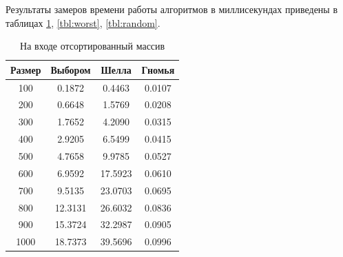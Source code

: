 Результаты замеров времени работы алгоритмов в миллисекундах приведены в таблицах \ref{tbl:best}, \ref{tbl:worst}, \ref{tbl:random}.

\begin{table}[h]
	\begin{center}
		\begin{threeparttable}
		\captionsetup{justification=raggedleft,singlelinecheck=off}
		\caption{На входе отсортированный массив}
		\label{tbl:best}
		\begin{tabular}{|c|c|c|c|}
			\hline
			Размер & Выбором & Шелла & Гномья \\
			\hline
  			100 & 0.1872 & 0.4463 & 0.0107 \\ 
 			\hline
  			200 & 0.6648 & 1.5769 & 0.0208 \\ 
 			\hline
  			300 & 1.7652 & 4.2090 & 0.0315 \\ 
 			\hline
  			400 & 2.9205 & 6.5499 & 0.0415 \\ 
 			\hline
  			500 & 4.7658 & 9.9785 & 0.0527 \\ 
 			\hline
  			600 & 6.9592 & 17.5923 & 0.0610 \\ 
 			\hline
  			700 & 9.5135 & 23.0703 & 0.0695 \\ 
 			\hline
  			800 & 12.3131 & 26.6032 & 0.0836 \\ 
 			\hline
  			900 & 15.3724 & 32.2987 & 0.0905 \\ 
 			\hline
 			1000 & 18.7373 & 39.5696 & 0.0996 \\ 
 			\hline
		\end{tabular}
		\end{threeparttable}
    \end{center}
\end{table}

\clearpage

